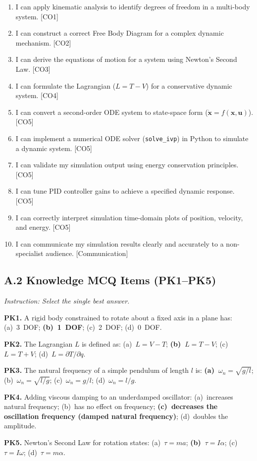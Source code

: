 \documentclass[utf8]{FrontiersinHarvard}
\begin{document}
\begin{enumerate}\setlength{\itemsep}{2pt}\setlength{\parskip}{0pt}
  \item I can apply kinematic analysis to identify degrees of freedom
    in a multi-body system. [CO1]
  \item I can construct a correct Free Body Diagram for a complex
    dynamic mechanism. [CO2]
  \item I can derive the equations of motion for a system using
    Newton's Second Law. [CO3]
  \item I can formulate the Lagrangian ($L = T - V$) for a conservative
    dynamic system. [CO4]
  \item I can convert a second-order ODE system to state-space form
    ($\dot{\mathbf{x}} = f(\mathbf{x},\mathbf{u})$). [CO5]
  \item I can implement a numerical ODE solver (\texttt{solve\_ivp})
    in Python to simulate a dynamic system. [CO5]
  \item I can validate my simulation output using energy conservation
    principles. [CO5]
  \item I can tune PID controller gains to achieve a specified dynamic
    response. [CO5]
  \item I can correctly interpret simulation time-domain plots of
    position, velocity, and energy. [CO5]
  \item I can communicate my simulation results clearly and accurately
    to a non-specialist audience. [Communication]
\end{enumerate}

\subsection*{A.2 Knowledge MCQ Items (PK1--PK5)}
\textit{Instruction: Select the single best answer.}

\textbf{PK1.} A rigid body constrained to rotate about a fixed axis in a
plane has: (a)~3~DOF; \textbf{(b)~1~DOF}; (c)~2~DOF; (d)~0~DOF.

\textbf{PK2.} The Lagrangian $L$ is defined as: (a)~$L = V - T$;
\textbf{(b)~$L = T - V$}; (c)~$L = T + V$; (d)~$L = \partial T/\partial q$.

\textbf{PK3.} The natural frequency of a simple pendulum of length $l$
is: \textbf{(a)~$\omega_n = \sqrt{g/l}$}; (b)~$\omega_n = \sqrt{l/g}$;
(c)~$\omega_n = g/l$; (d)~$\omega_n = l/g$.

\textbf{PK4.} Adding viscous damping to an underdamped oscillator:
(a)~increases natural frequency; (b)~has no effect on frequency;
\textbf{(c)~decreases the oscillation frequency (damped natural frequency)};
(d)~doubles the amplitude.

\textbf{PK5.} Newton's Second Law for rotation states:
(a)~$\tau = ma$; \textbf{(b)~$\tau = I\alpha$};
(c)~$\tau = I\omega$; (d)~$\tau = m\alpha$.
\end{document}
